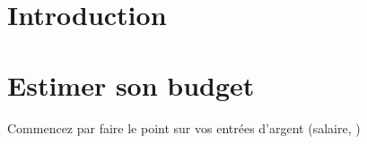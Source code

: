 \documentclass[french]{article}
\begin{document}
\section{Introduction}
\section{Estimer son budget}
Commencez par faire le point sur vos entrées d'argent (salaire, )
\end{document}
